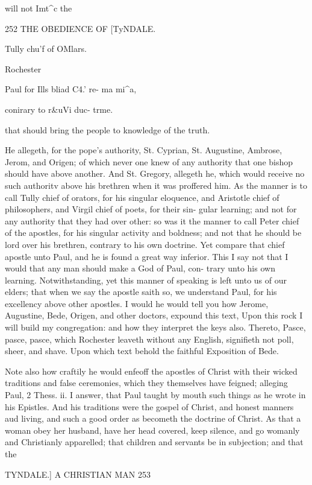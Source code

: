 \documentclass{custom}
\begin{document}
{will not 
Imt^c the 


252
THE OBEDIENCE OF
[TyNDALE.

Tully chu'f 
of OMlars. 

Rochester 

Paul for Ills 
bliad C4.' re- 
ma mi^a, 

conirary to 
r&uVi duc- 
trme. 

that should bring the people to knowledge of the 
truth. 

He allegeth, for the pope's authority, St. Cyprian, 
St. Augustine, Ambrose, Jerom, and Origen; of which 
never one knew of any authority that one bishop should 
have above another. And St. Gregory, allegeth he, which 
would receive no such authoritv above his brethren when it 
was proffered him. As the manner is to call Tully chief 
of orators, for his singular eloquence, and Aristotle chief 
of philosophers, and Virgil chief of poets, for their sin- 
gular learning; and not for any authority that they had 
over other: so was it the manner to call Peter chief of the 
apostles, for his singular activity and boldness; and not 
that he should be lord over his brethren, contrary to his 
own doctrine. Yet compare that chief apostle unto Paul, 
and he is found a great way inferior. This I say not that 
I would that any man should make a God of Paul, con- 
trary unto his own learning. Notwithstanding, yet this 
manner of speaking is left unto us of our elders; that 
when we say the apostle saith so, we understand Paul, for 
his excellency above other apostles. I would he would 
tell you how Jerome, Augustine, Bede, Origen, and other 
doctors, expound this text, Upon this rock I will build my 
congregation: and how they interpret the keys also. 
Thereto, Pasce, pasce, pasce, which Rochester leaveth 
without any English, signifieth not poll, sheer, and shave. 
Upon which text behold the faithful Exposition of Bede. 

Note also how craftily he would enfeoff the apostles of 
Christ with their wicked traditions and false ceremonies, 
which they themselves have feigned; alleging Paul, 
2 Thess. ii. I answer, that Paul taught by mouth such 
things as he wrote in his Epistles. And his traditions 
were the gospel of Christ, and honest manners aud living, 
and such a good order as becometh the doctrine of Christ. 
As that a woman obey her husband, have her head covered, 
keep silence, and go womanly and Christianly apparelled; 
that children and servants be in subjection; and that the 


TYNDALE.]
A CHRISTIAN MAN
253 

}
\end{document}
